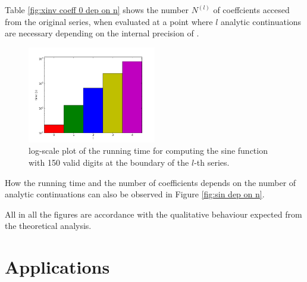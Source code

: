 		Table \ref{fig:xinv coeff 0 dep on n} shows the number $N^{(l)}$ of coeffcients accesed from the original series, when evaluated at a point where $l$ analytic continuations are necessary depending on 
		the internal precision of \irram.

		\begin{figure}[h]
			\centering
			\includegraphics[width=0.5\textwidth]{img/analytic/sin_for_n_prec_150_dep_on_series_log.png}
			\caption{log-scale plot of the running time for \anarect computing the sine function with 150 valid digits at the boundary of the $l$-th series.}
			\label{fig:sin dep on series}
		\end{figure}

		How the running time and the number of coefficients  depends on the number of analytic continuations can also be observed in Figure \ref{fig:sin dep on n}. 

		All in all the figures are accordance with the qualitative behaviour expected from the theoretical analysis.
	\section{Applications}